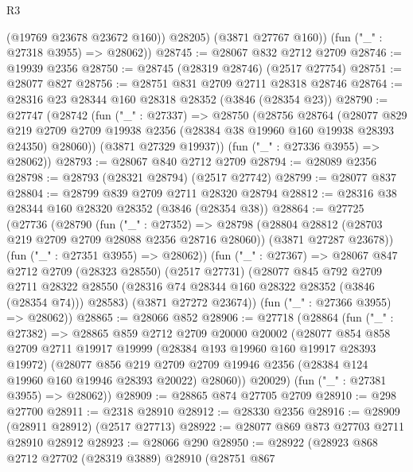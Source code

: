 \begin{lexlean}{R3}
\begin{coremodule}
            (@19769 @23678 @23672 @160))
          @28205)
        (@3871 @27767 @160))
      (fun ("_" : @27318 @3955) => @28062))
@28745 := @28067 @832 @2712 @2709
@28746 := @19939 @2356
@28750 := @28745 (@28319 @28746) (@2517 @27754)
@28751 := @28077 @827
@28756 := @28751 @831 @2709 @2711 @28318 @28746
@28764 := @28316 @23 @28344 @160 @28318 @28352 (@3846 (@28354 @23))
@28790 := @27747
    (@28742
      (fun ("_" : @27337) =>
      @28750
        (@28756
          @28764
          (@28077
            @829
            @219
            @2709
            @2709
            @19938
            @2356
            (@28384 @38 @19960 @160 @19938 @28393 @24350)
            @28060))
        (@3871 @27329 @19937))
      (fun ("_" : @27336 @3955) => @28062))
@28793 := @28067 @840 @2712 @2709
@28794 := @28089 @2356
@28798 := @28793 (@28321 @28794) (@2517 @27742)
@28799 := @28077 @837
@28804 := @28799 @839 @2709 @2711 @28320 @28794
@28812 := @28316 @38 @28344 @160 @28320 @28352 (@3846 (@28354 @38))
@28864 := @27725
    (@27736
      (@28790
        (fun ("_" : @27352) =>
        @28798
          (@28804 @28812 (@28703 @219 @2709 @2709 @28088 @2356 @28716 @28060))
          (@3871 @27287 @23678))
        (fun ("_" : @27351 @3955) => @28062))
      (fun ("_" : @27367) =>
      @28067
        @847
        @2712
        @2709
        (@28323 @28550)
        (@2517 @27731)
        (@28077
          @845
          @792
          @2709
          @2711
          @28322
          @28550
          (@28316 @74 @28344 @160 @28322 @28352 (@3846 (@28354 @74)))
          @28583)
        (@3871 @27272 @23674))
      (fun ("_" : @27366 @3955) => @28062))
@28865 := @28066 @852
@28906 := @27718
    (@28864
      (fun ("_" : @27382) =>
      @28865
        @859
        @2712
        @2709
        @20000
        @20002
        (@28077
          @854
          @858
          @2709
          @2711
          @19917
          @19999
          (@28384 @193 @19960 @160 @19917 @28393 @19972)
          (@28077
            @856
            @219
            @2709
            @2709
            @19946
            @2356
            (@28384 @124 @19960 @160 @19946 @28393 @20022)
            @28060))
        @20029)
      (fun ("_" : @27381 @3955) => @28062))
@28909 := @28865 @874 @27705 @2709
@28910 := @298 @27700
@28911 := @2318 @28910
@28912 := @28330 @2356
@28916 := @28909 (@28911 @28912) (@2517 @27713)
@28922 := @28077 @869 @873 @27703 @2711 @28910 @28912
@28923 := @28066 @290
@28950 := @28922
    (@28923
      @868
      @2712
      @27702
      (@28319 @3889)
      @28910
      (@28751
        @867

\end{coremodule}
\end{lexlean}
